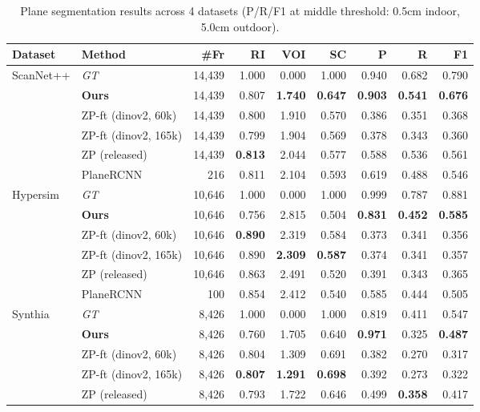 \begin{table}[t]
\centering
\caption{Plane segmentation results across 4 datasets (P/R/F1 at middle threshold: 0.5cm indoor, 5.0cm outdoor).}
\label{tab:combined_compact}
\begin{tabular}{l l r r r r r r r}
\toprule
Dataset & Method & \#Fr & RI & VOI & SC & P & R & F1 \\
\midrule
ScanNet++ & \textit{GT} & 14,439 & 1.000 & 0.000 & 1.000 & 0.940 & 0.682 & 0.790 \\
 & \textbf{Ours} & 14,439 & 0.807 & \textbf{1.740} & \textbf{0.647} & \textbf{0.903} & \textbf{0.541} & \textbf{0.676} \\
 & ZP-ft (dinov2, 60k) & 14,439 & 0.800 & 1.910 & 0.570 & 0.386 & 0.351 & 0.368 \\
 & ZP-ft (dinov2, 165k) & 14,439 & 0.799 & 1.904 & 0.569 & 0.378 & 0.343 & 0.360 \\
 & ZP (released) & 14,439 & \textbf{0.813} & 2.044 & 0.577 & 0.588 & 0.536 & 0.561 \\
 & PlaneRCNN & 216 & 0.811 & 2.104 & 0.593 & 0.619 & 0.488 & 0.546 \\
\midrule
Hypersim & \textit{GT} & 10,646 & 1.000 & 0.000 & 1.000 & 0.999 & 0.787 & 0.881 \\
 & \textbf{Ours} & 10,646 & 0.756 & 2.815 & 0.504 & \textbf{0.831} & \textbf{0.452} & \textbf{0.585} \\
 & ZP-ft (dinov2, 60k) & 10,646 & \textbf{0.890} & 2.319 & 0.584 & 0.373 & 0.341 & 0.356 \\
 & ZP-ft (dinov2, 165k) & 10,646 & 0.890 & \textbf{2.309} & \textbf{0.587} & 0.374 & 0.341 & 0.357 \\
 & ZP (released) & 10,646 & 0.863 & 2.491 & 0.520 & 0.391 & 0.343 & 0.365 \\
 & PlaneRCNN & 100 & 0.854 & 2.412 & 0.540 & 0.585 & 0.444 & 0.505 \\
\midrule
Synthia & \textit{GT} & 8,426 & 1.000 & 0.000 & 1.000 & 0.819 & 0.411 & 0.547 \\
 & \textbf{Ours} & 8,426 & 0.760 & 1.705 & 0.640 & \textbf{0.971} & 0.325 & \textbf{0.487} \\
 & ZP-ft (dinov2, 60k) & 8,426 & 0.804 & 1.309 & 0.691 & 0.382 & 0.270 & 0.317 \\
 & ZP-ft (dinov2, 165k) & 8,426 & \textbf{0.807} & \textbf{1.291} & \textbf{0.698} & 0.392 & 0.273 & 0.322 \\
 & ZP (released) & 8,426 & 0.793 & 1.722 & 0.646 & 0.499 & \textbf{0.358} & 0.417 \\

\end{tabular}
\end{table}
